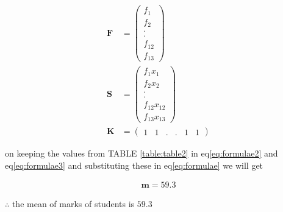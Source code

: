 \documentclass[journal,12pt,twocolumn]{IEEEtran}
\let\vec\mathbf
\newcommand{\myvec}[1]{\ensuremath{\begin{pmatrix}#1\end{pmatrix}}}
\begin{document}
     \begin{align}
    	 \label{eq:formulae2}
	      	\vec{F}&=\myvec{f_{1}\\f_{2}\\.\\.\\f_{12}\\f_{13}}     \\
	     \label{eq:formulae3}
	      	\vec{S}&=\myvec{f_{1}x_{1}\\f_{2}x_{2}\\.\\.\\f_{12}x_{12}\\f_{13}x_{13}}    \\
	     \label{eq:formulae4}
      		\vec{K}&=\myvec{1 & 1 & . & . & 1 & 1}
    \end{align}
    
    on keeping the values from TABLE \ref{table:table2} in eq\eqref{eq:formulae2} and eq\eqref{eq:formulae3} and substituting these in eq\eqref{eq:formulae} we will get

     \begin{align}
         \vec{m} = 59.3
     \end{align}
 
    
    $\therefore$ the mean of marks of students is $59.3$
    
\end{document}
